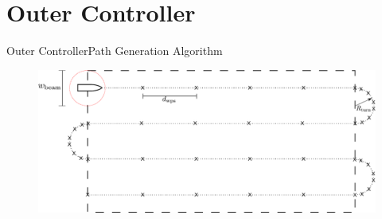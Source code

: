 \section{Outer Controller}

\begin{frame}{Outer Controller}{Path Generation Algorithm}
    \begin{figure}[H]
        \centering
        \includegraphics[width=1\textwidth]{figures/pathGen} 
    \end{figure}       
\end{frame}

